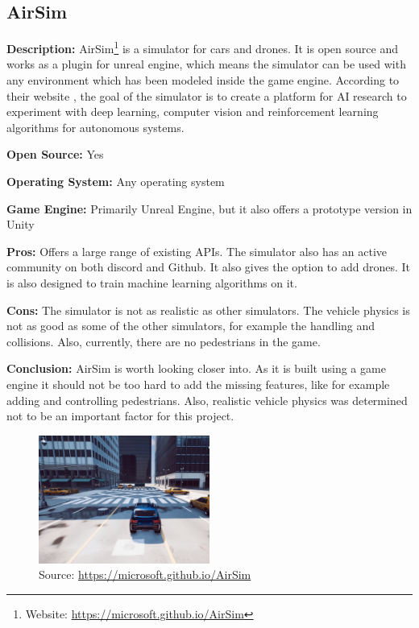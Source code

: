 \subsection{AirSim}
\textbf{Description:} AirSim\footnote{Website: \url{https://microsoft.github.io/AirSim}} is a simulator for cars and drones. It is open source and works as a plugin for unreal engine, which means the simulator can be used with any environment which has been modeled inside the game engine. According to their website \cite{AirSim_Website}, the goal of the simulator is to create a platform for AI research to experiment with deep learning, computer vision and reinforcement learning algorithms for autonomous systems. 

\textbf{Open Source:} Yes

\textbf{Operating System:} Any operating system

\textbf{Game Engine:} Primarily Unreal Engine, but it also offers a prototype version in Unity

\textbf{Pros:} Offers a large range of existing APIs. The simulator also has an active community on both discord and Github. It also gives the option to add drones. It is also designed to train machine learning algorithms on it.

\textbf{Cons:} The simulator is not as realistic as other simulators. The vehicle physics is not as good as some of the other simulators, for example the handling and collisions. Also, currently, there are no pedestrians in the game. 

\textbf{Conclusion:} AirSim is worth looking closer into. As it is built using a game engine it should not be too hard to add the missing features, like for example adding and controlling pedestrians. Also, realistic vehicle physics was determined not to be an important factor for this project. 

\begin{figure}[H]
    \centering
    \includegraphics[width=0.5\textwidth]{Simulators/AirSim.JPG}
    \caption{Source: \url{https://microsoft.github.io/AirSim}}
\end{figure}

